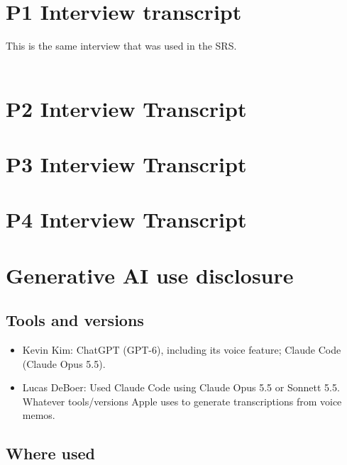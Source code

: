 \documentclass[12pt, titlepage]{article}
\begin{document}
\section{P1 Interview transcript}\label{app:p1interview}

This is the same interview that was used in the SRS.\\
\\

\section{P2 Interview Transcript}\label{app:p2interview}


\section{P3 Interview Transcript}\label{app:p3interview}


\section{P4 Interview Transcript}\label{app:p4interview}


\section{Generative AI use disclosure}\label{app:ai}

\subsection*{Tools and versions}
\begin{itemize}
    \item Kevin Kim: ChatGPT (GPT-6), including its voice feature; Claude Code (Claude Opus 5.5).
    \item Lucas DeBoer: Used Claude Code using Claude Opus 5.5 or Sonnett 5.5. Whatever tools/versions Apple uses to generate transcriptions from voice memos. 
\end{itemize}

\subsection*{Where used}
\end{document}
